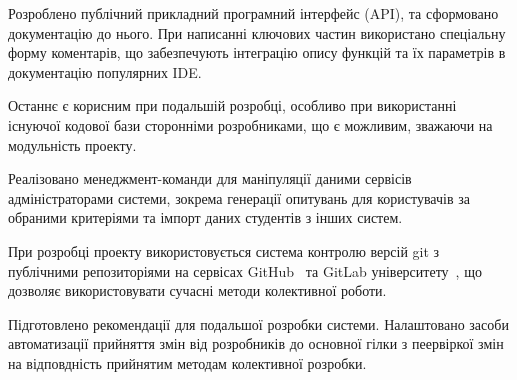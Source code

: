 Розроблено публічний прикладний програмний інтерфейс (API), та сформовано документацію до нього. При написанні ключових частин використано спеціальну форму коментарів, що забезпечують інтеграцію опису функцій та їх параметрів в документацію популярних IDE. 

Останнє є корисним при подальшій розробці, особливо при використанні існуючої кодової бази сторонніми розробниками, що є можливим, зважаючи на модульність проекту.

Реалізовано менеджмент-команди для маніпуляції даними сервісів адміністраторами системи, зокрема генерації опитувань для користувачів за обраними критеріями та імпорт даних студентів з інших систем.

При розробці проекту використовується система контролю версій git з публічними репозиторіями на сервісах GitHub~\cite{githubKSU} та GitLab університету~\cite{gitlabKSU}, що дозволяє використовувати сучасні методи колективної роботи.

Підготовлено рекомендації для подальшої розробки системи. Налаштовано засоби автоматизації прийняття змін від розробників до основної гілки з пеервіркої змін на відповдність прийнятим методам колективної розробки.
